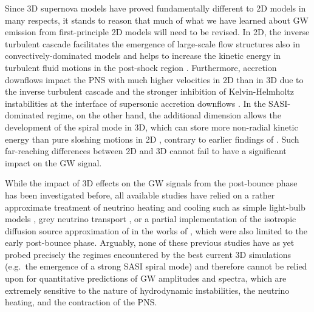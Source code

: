 Since 3D supernova models have proved fundamentally different to 2D
models in many respects, it stands to reason that much of what we have
learned about GW emission from first-principle 2D
models will need to be revised. In 2D, the inverse turbulent cascade
\citep{kraichnan_76} facilitates the emergence of large-scale flow
structures also in convectively-dominated models and helps to increase
the kinetic energy in turbulent fluid motions in the post-shock region
\citep{hanke_12}. Furthermore, accretion downflows impact the
PNS with much higher velocities in 2D than in 3D \citep{melson_15a} due to the
inverse turbulent cascade and the stronger inhibition of
Kelvin-Helmholtz instabilities at the interface of supersonic
accretion downflows \citep{mueller_15b}. In the SASI-dominated regime,
on the other hand, the additional dimension allows the development of
the spiral mode \citep{blondin_07a,blondin_07b,fernandez_10} in 3D,
which can store more non-radial kinetic energy than pure sloshing
motions in 2D \citep{hanke_13,fernandez_15}, contrary to earlier
findings of \cite{iwakami_08}. Such far-reaching differences
between 2D and 3D cannot fail to have a significant impact on
the GW signal. 

While the impact of 3D effects on the GW signals from
the post-bounce phase has been investigated before, all available
studies have relied on a rather approximate treatment of neutrino
heating and cooling such as simple light-bulb models
\citep{mueller_97,kotake_09,kotake_11}, grey neutrino transport
\citep{fryer_04,mueller_e_12}, or a partial implementation of the
isotropic diffusion source approximation of \citet{liebendoerfer_09}
in the works of \citet{scheidegger_08,scheidegger_10}, which were also
limited to the early post-bounce phase.  Arguably, none of these
previous studies have as yet probed precisely the regimes encountered
by the best current 3D simulations (e.g.\ the emergence
of a strong SASI spiral mode) and therefore cannot be relied upon for quantitative
predictions of GW amplitudes and spectra, which
are extremely sensitive to the nature of hydrodynamic instabilities,
the neutrino heating, and the contraction of the PNS.

